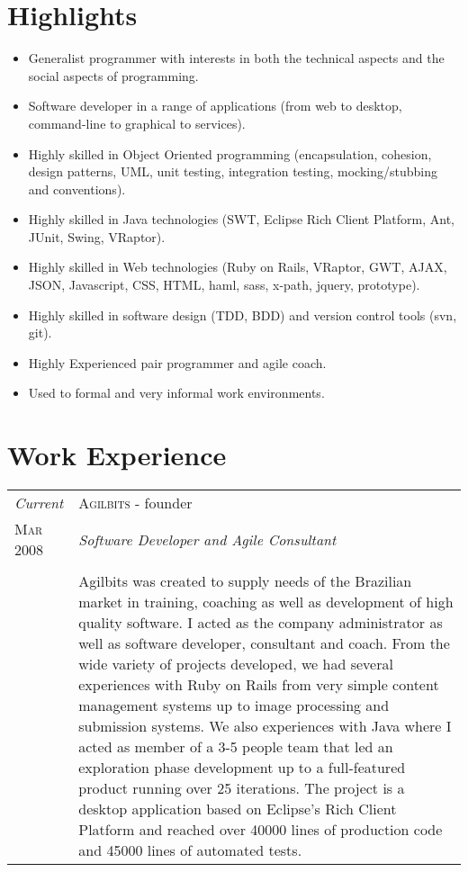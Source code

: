 \documentclass[letter,10pt]{article}
\begin{document}
\section{Highlights}

\begin{itemize}
\item Generalist programmer with interests in both the technical
  aspects and the social aspects of programming.
\item Software developer in a range of applications (from web to
  desktop, command-line to graphical to services).
\item Highly skilled in Object Oriented programming (encapsulation,
  cohesion, design patterns, UML, unit testing, integration testing,
  mocking/stubbing and conventions).
\item Highly skilled in Java technologies (SWT, Eclipse Rich Client
  Platform, Ant, JUnit, Swing, VRaptor).
\item Highly skilled in Web technologies (Ruby on Rails, VRaptor, GWT,
  AJAX, JSON, Javascript, CSS, HTML, haml, sass, x-path, jquery,
  prototype).
\item Highly skilled in software design (TDD, BDD) and version control
  tools (svn, git).
\item Highly Experienced pair programmer and agile coach.
\item Used to formal and very informal work environments.
\end{itemize}

\section{Work Experience}

\begin{tabular}{p{2.5cm}|p{13.5cm}}
  \emph{Current} & \textsc{Agilbits} - founder\\
  \textsc{Mar 2008}& \emph{Software Developer and Agile Consultant}\\
  &\\
  &Agilbits was created
  to supply needs of the Brazilian market in training, coaching as
  well as development of high quality software. I acted as the
  company administrator as well as software developer, consultant
  and coach.
  From the wide variety of projects developed, we had several
  experiences with Ruby on Rails from very simple content management
  systems up to image processing and submission systems.
  We also experiences with Java where I acted as member of a 3-5
  people team that led an exploration phase development up to a
  full-featured product running over 25 iterations. The project is a
  desktop application based on Eclipse's Rich Client Platform and
  reached over 40000 lines of production code and 45000 lines of
  automated tests.
\end{tabular}
\end{document}
